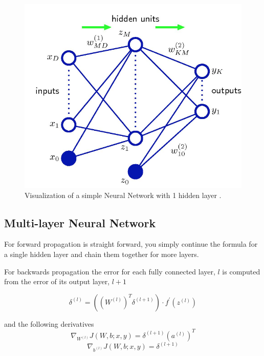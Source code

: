 \documentclass[12pt, twocolumn]{article}
\begin{document}
\begin{figure}
\includegraphics[scale=.7]{simpleNN.png}

\caption{Visualization of a simple Neural Network with 1 hidden layer \cite{Bishop} . }
\label{fig:basicNN}
\end{figure}





\subsection{Multi-layer Neural Network}
For forward propagation is straight forward, you simply continue the formula for a single hidden layer and chain them together for more layers. 

For backwards propagation the error for each fully connected layer, $l$ is computed from the error of its output layer, $l+1$  

\begin{equation}
\delta^{(l)}=((W^{(l)})^T \delta^{(l+1)}) \cdot f ^{\prime} (z^{(l)})
\end{equation}

and the following derivatives 
\begin{equation}
\nabla_{W^{(l)}}J(W,b;x,y) = \delta^{(l+1)}(a^{(l)})^T
\end{equation}
\begin{equation}
\nabla_{b^{(l)}}J(W,b;x,y)= \delta^{(l+1)}
\end{equation}
\end{document}
